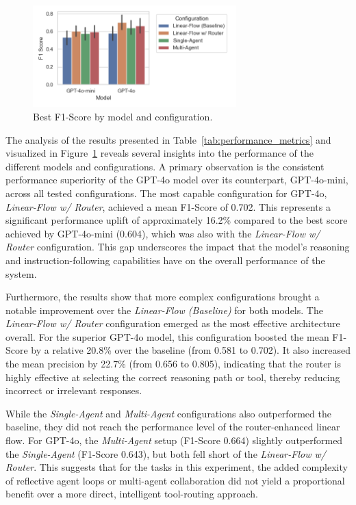         \begin{figure}[h]
            \centering
            \includegraphics[width=0.7\textwidth]{images_exp2/bar_best_f1_by_model_and_configuration.png}
            \caption{Best F1-Score by model and configuration.}
            \label{fig:best_f1_by_model_and_configuration}
        \end{figure}

        
        The analysis of the results presented in Table~\ref{tab:performance_metrics} and visualized in Figure~\ref{fig:best_f1_by_model_and_configuration} reveals several insights into the performance of the different models and configurations. A primary observation is the consistent performance superiority of the GPT-4o model over its counterpart, GPT-4o-mini, across all tested configurations. The most capable configuration for GPT-4o, \textit{Linear-Flow w/ Router}, achieved a mean F1-Score of 0.702. This represents a significant performance uplift of approximately 16.2\% compared to the best score achieved by GPT-4o-mini (0.604), which was also with the \textit{Linear-Flow w/ Router} configuration. This gap underscores the impact that the model's reasoning and instruction-following capabilities have on the overall performance of the system.

        Furthermore, the results show that more complex configurations brought a notable improvement over the \textit{Linear-Flow (Baseline)} for both models. The \textit{Linear-Flow w/ Router} configuration emerged as the most effective architecture overall. For the superior GPT-4o model, this configuration boosted the mean F1-Score by a relative 20.8\% over the baseline (from 0.581 to 0.702). It also increased the mean precision by 22.7\% (from 0.656 to 0.805), indicating that the router is highly effective at selecting the correct reasoning path or tool, thereby reducing incorrect or irrelevant responses.

        While the \textit{Single-Agent} and \textit{Multi-Agent} configurations also outperformed the baseline, they did not reach the performance level of the router-enhanced linear flow. For GPT-4o, the \textit{Multi-Agent} setup (F1-Score 0.664) slightly outperformed the \textit{Single-Agent} (F1-Score 0.643), but both fell short of the \textit{Linear-Flow w/ Router}. This suggests that for the tasks in this experiment, the added complexity of reflective agent loops or multi-agent collaboration did not yield a proportional benefit over a more direct, intelligent tool-routing approach.

